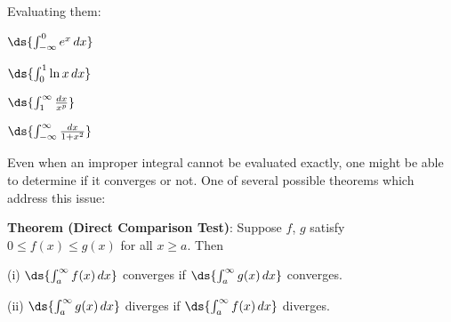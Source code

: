 \documentclass[12pt,fleqn]{article}
\begin{document}
\newpage
Evaluating them:
\bi
\item[]
  $\ds{\int_{-\infty}^0 e^x \, dx}$
\vspace{0.5in}
\item[]
  $\ds{\int_0^1 \ln x \, dx}$
\vspace{0.5in}
\item[]
  $\ds{\int_1^\infty \frac{dx}{x^p}}$
\vspace{2.0in}
\item[]
  $\ds{\int_{-\infty}^\infty \frac{dx}{1+x^2}}$
\ei

\vspace{1in}
\ni
Even when an improper integral cannot be evaluated exactly, one might
be able to determine if it converges or not.  One of several possible
theorems which address this issue:

\vspace{0.2in}
\ni
{\bf Theorem (Direct Comparison Test)}: \; Suppose $f$, $g$ satisfy
$0 \le f(x) \le g(x)$ for all $x \ge a$.  Then
\be
\item[(i)]
  $\ds{\int_a^\infty f(x)\, dx}$ \; converges if \;
  $\ds{\int_a^\infty g(x)\,dx}$ \; converges.
\item[(ii)]
  $\ds{\int_a^\infty g(x)\, dx}$ \; diverges if \;
  $\ds{\int_a^\infty f(x)\,dx}$ \; diverges.
\ee
\end{document}
